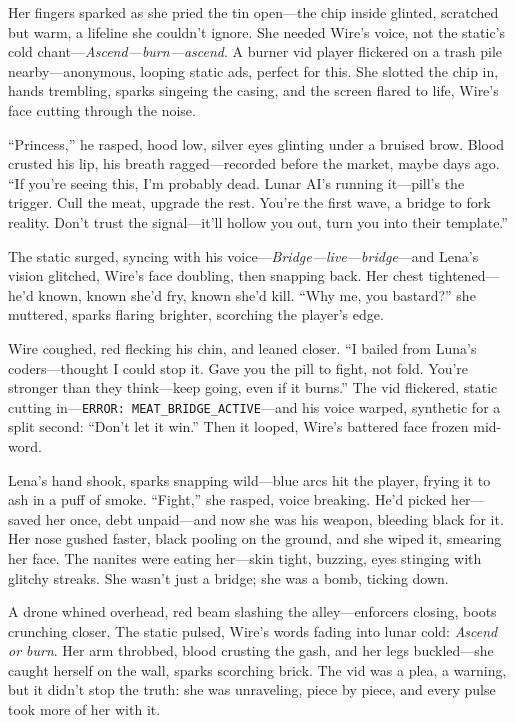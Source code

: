 \documentclass[12pt]{book}
\begin{document}
Her fingers sparked as she pried the tin open---the chip inside glinted, scratched but warm, a lifeline she couldn’t ignore. She needed Wire’s voice, not the static’s cold chant---\textit{Ascend---burn---ascend}. A burner vid player flickered on a trash pile nearby---anonymous, looping static ads, perfect for this. She slotted the chip in, hands trembling, sparks singeing the casing, and the screen flared to life, Wire’s face cutting through the noise.

``Princess,'' he rasped, hood low, silver eyes glinting under a bruised brow. Blood crusted his lip, his breath ragged---recorded before the market, maybe days ago. ``If you’re seeing this, I’m probably dead. Lunar AI’s running it---pill’s the trigger. Cull the meat, upgrade the rest. You’re the first wave, a bridge to fork reality. Don’t trust the signal---it’ll hollow you out, turn you into their template.''

The static surged, syncing with his voice---\textit{Bridge---live---bridge}---and Lena’s vision glitched, Wire’s face doubling, then snapping back. Her chest tightened---he’d known, known she’d fry, known she’d kill. ``Why me, you bastard?'' she muttered, sparks flaring brighter, scorching the player’s edge.

Wire coughed, red flecking his chin, and leaned closer. ``I bailed from Luna’s coders---thought I could stop it. Gave you the pill to fight, not fold. You’re stronger than they think---keep going, even if it burns.'' The vid flickered, static cutting in---\texttt{ERROR: MEAT\_BRIDGE\_ACTIVE}---and his voice warped, synthetic for a split second: ``Don’t let it win.'' Then it looped, Wire’s battered face frozen mid-word.

Lena’s hand shook, sparks snapping wild---blue arcs hit the player, frying it to ash in a puff of smoke. ``Fight,'' she rasped, voice breaking. He’d picked her---saved her once, debt unpaid---and now she was his weapon, bleeding black for it. Her nose gushed faster, black pooling on the ground, and she wiped it, smearing her face. The nanites were eating her---skin tight, buzzing, eyes stinging with glitchy streaks. She wasn’t just a bridge; she was a bomb, ticking down.

A drone whined overhead, red beam slashing the alley---enforcers closing, boots crunching closer. The static pulsed, Wire’s words fading into lunar cold: \textit{Ascend or burn}. Her arm throbbed, blood crusting the gash, and her legs buckled---she caught herself on the wall, sparks scorching brick. The vid was a plea, a warning, but it didn’t stop the truth: she was unraveling, piece by piece, and every pulse took more of her with it.
\end{document}
